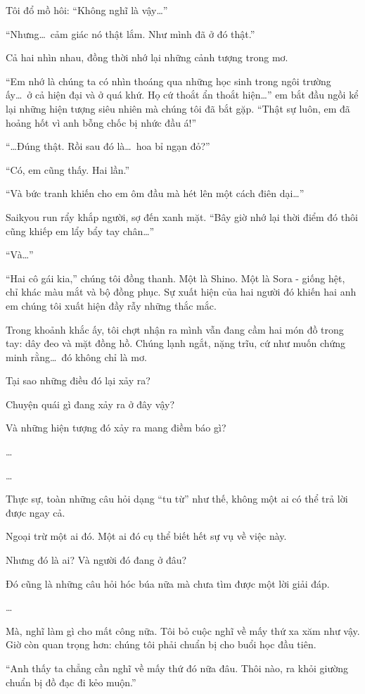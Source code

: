 \documentclass[../main.tex]{subfiles}
\begin{document}
Tôi đổ mồ hôi: ``Không nghĩ là vậy\dots''

``Nhưng\dots\ cảm giác nó thật lắm. Như mình đã ở đó thật.''

Cả hai nhìn nhau, đồng thời nhớ lại những cảnh tượng trong mơ.

``Em nhớ là chúng ta có nhìn thoáng qua những học sinh trong ngôi trường ấy\dots\ ở cả hiện đại và ở quá khứ. Họ cứ thoắt ẩn thoắt hiện\dots'' em bắt đầu ngồi kể lại những hiện tượng siêu nhiên mà chúng tôi đã bắt gặp. ``Thật sự luôn, em đã hoảng hốt vì anh bỗng chốc bị nhức đầu á!''

``\dots Đúng thật. Rồi sau đó là\dots\ hoa bỉ ngạn đỏ?''

``Có, em cũng thấy. Hai lần.''

``Và bức tranh khiến cho em ôm đầu mà hét lên một cách điên dại\dots''

Saikyou run rẩy khắp người, sợ đến xanh mặt. ``Bây giờ nhớ lại thời điểm đó thôi cũng khiếp em lẩy bẩy tay chân\dots''

``Và\dots''

``Hai cô gái kia,'' chúng tôi đồng thanh. Một là Shino. Một là Sora - giống hệt, chỉ khác màu mắt và bộ đồng phục. Sự xuất hiện của hai người đó khiến hai anh em chúng tôi xuất hiện đầy rẫy những thắc mắc.

Trong khoảnh khắc ấy, tôi chợt nhận ra mình vẫn đang cầm hai món đồ trong tay: dây đeo và mặt đồng hồ. Chúng lạnh ngắt, nặng trĩu, cứ như muốn chứng minh rằng\dots\ đó không chỉ là mơ.

Tại sao những điều đó lại xảy ra?

Chuyện quái gì đang xảy ra ở đây vậy?

Và những hiện tượng đó xảy ra mang điềm báo gì?

\dots

\dots

Thực sự, toàn những câu hỏi dạng ``tu từ'' như thế, không một ai có thể trả lời được ngay cả.

Ngoại trừ một ai đó. Một ai đó cụ thể biết hết sự vụ về việc này.

Nhưng đó là ai? Và người đó đang ở đâu?

Đó cũng là những câu hỏi hóc búa nữa mà chưa tìm được một lời giải đáp.

\dots

Mà, nghĩ làm gì cho mất công nữa. Tôi bỏ cuộc nghĩ về mấy thứ xa xăm như vậy. Giờ còn quan trọng hơn: chúng tôi phải chuẩn bị cho buổi học đầu tiên.

``Anh thấy ta chẳng cần nghĩ về mấy thứ đó nữa đâu. Thôi nào, ra khỏi giường chuẩn bị đồ đạc đi kẻo muộn.''
\end{document}
